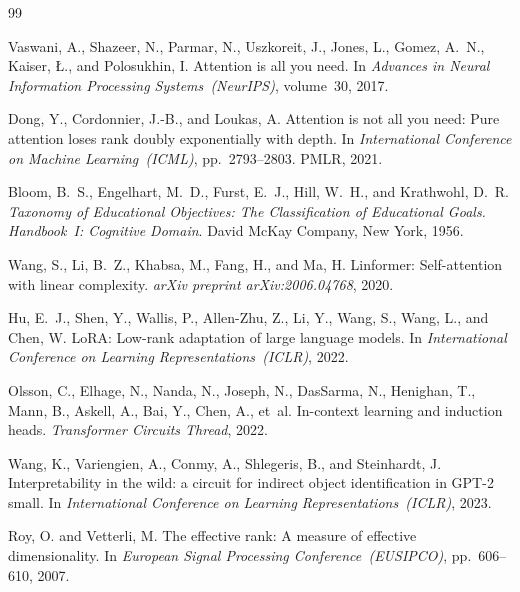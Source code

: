 \documentclass{article}
\begin{document}

\begin{thebibliography}{99}

Vaswani, A., Shazeer, N., Parmar, N., Uszkoreit, J., Jones, L., Gomez, A.~N.,
Kaiser, \L., and Polosukhin, I.
\newblock Attention is all you need.
\newblock In \emph{Advances in Neural Information Processing Systems~(NeurIPS)}, volume~30, 2017.

Dong, Y., Cordonnier, J.-B., and Loukas, A.
\newblock Attention is not all you need: Pure attention loses rank doubly
  exponentially with depth.
\newblock In \emph{International Conference on Machine Learning~(ICML)},
  pp.~2793--2803. PMLR, 2021.

Bloom, B.~S., Engelhart, M.~D., Furst, E.~J., Hill, W.~H., and
  Krathwohl, D.~R.
\newblock \emph{Taxonomy of Educational Objectives: The Classification of Educational
  Goals.  Handbook~I: Cognitive Domain}.
\newblock David McKay Company, New York, 1956.

Wang, S., Li, B.~Z., Khabsa, M., Fang, H., and Ma, H.
\newblock Linformer: Self-attention with linear complexity.
\newblock \emph{arXiv preprint arXiv:2006.04768}, 2020.

Hu, E.~J., Shen, Y., Wallis, P., Allen-Zhu, Z., Li, Y., Wang, S., Wang, L.,
  and Chen, W.
\newblock LoRA: Low-rank adaptation of large language models.
\newblock In \emph{International Conference on Learning Representations~(ICLR)}, 2022.

Olsson, C., Elhage, N., Nanda, N., Joseph, N., DasSarma, N., Henighan, T.,
  Mann, B., Askell, A., Bai, Y., Chen, A., et~al.
\newblock In-context learning and induction heads.
\newblock \emph{Transformer Circuits Thread}, 2022.

Wang, K., Variengien, A., Conmy, A., Shlegeris, B., and Steinhardt, J.
\newblock Interpretability in the wild: a circuit for indirect object
  identification in GPT-2 small.
\newblock In \emph{International Conference on Learning Representations~(ICLR)}, 2023.

Roy, O. and Vetterli, M.
\newblock The effective rank: A measure of effective dimensionality.
\newblock In \emph{European Signal Processing Conference~(EUSIPCO)},
  pp.~606--610, 2007.


\end{thebibliography}
\end{document}
